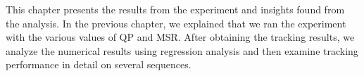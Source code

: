 This chapter presents the results from the experiment and insights found from the analysis. In the previous chapter, we explained that we ran the experiment with the various values of QP and MSR. After obtaining the tracking results, we analyze the numerical results using regression analysis and then examine tracking performance in detail on several sequences.
